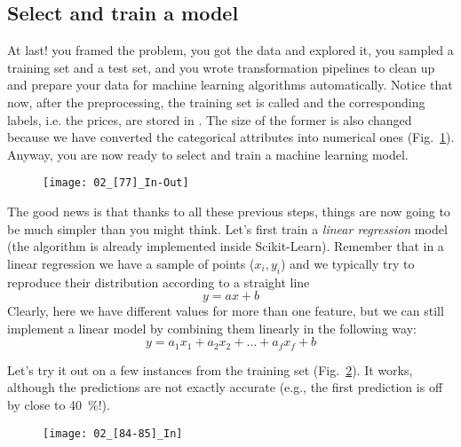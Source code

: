 \subsection{Select and train a model}
At last! you framed the problem, you got the data and explored it, you sampled a training set and a test set, and you wrote transformation pipelines to clean up and prepare your data for machine learning algorithms automatically. Notice that now, after the preprocessing, the training set is called  and the corresponding labels, i.e. the prices, are stored in . The size of the former is also changed because we have converted the categorical attributes into numerical ones (Fig.~\ref{02_[77]_In-Out}). Anyway, you are now ready to select and train a machine learning model.
\begin{figure}[!ht]
\centering
\texttt{[image: 02\_[77]\_In-Out]}
\caption{}\label{02_[77]_In-Out}
\end{figure}

The good news is that thanks to all these previous steps, things are now going to be much simpler than you might think. Let's first train a \emph{linear regression} model (the algorithm is already implemented inside Scikit-Learn). Remember that in a linear regression we have a sample of points ($x_i,y_i$) and we typically try to reproduce their distribution according to a straight line
\begin{equation}
y=ax+b
\end{equation}
Clearly, here we have different values for more than one feature, but we can still implement a linear model by combining them linearly in the following way:
\begin{equation}
y=a_1x_1+a_2x_2+\ldots+a_fx_f+b
\end{equation}

Let's try it out on a few instances from the training set (Fig.~\ref{02_[84-85]_In}). It works, although the predictions are not exactly accurate (e.g., the first prediction is off by close to \SI{40}{\percent}!).
\begin{figure}[h!t]
\centering
\texttt{[image: 02\_[84-85]\_In]}
\caption{}\label{02_[84-85]_In}
\end{figure}

